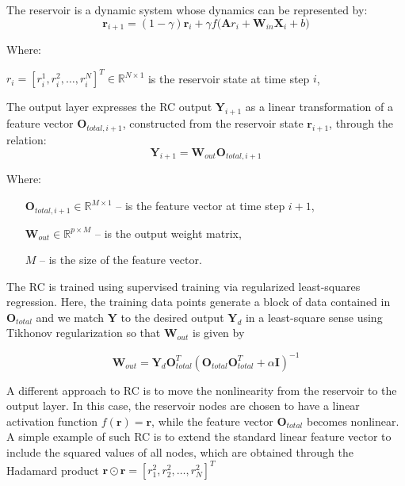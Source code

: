 \documentclass[11pt, oneside]{article}
\begin{document}
The reservoir is a
dynamic system whose dynamics can be represented by:
\begin{equation}
    \mathbf{r}_{i+1} = (1 - \gamma) \mathbf{r}_i + \gamma f \big(\mathbf{A} r_i + \mathbf{W}_{in} \mathbf{X}_i + b \big)
\end{equation}

Where:

\( r_i = [r_i^1, r_i^2, \ldots, r_i^N]^T \in \mathbb{R}^{N \times 1} \) is the reservoir state at time step \(i\),

The output layer expresses the RC output \(\mathbf{Y}_{i+1}\) as a linear
transformation of a feature vector \(\mathbf{O}_{total,i+1}\), constructed from the
reservoir state \(\mathbf{r}_{i+1}\), through the relation:
\begin{equation}
    \mathbf{Y}_{i+1} = \mathbf{W}_{out} \mathbf{O}_{total,i+1}
\end{equation}

Where:
\begin{itemize}[noitemsep, leftmargin=4cm, label={}]
    \item [\(\mathbf{O}_{total,i+1} \in \mathbb{R}^{M \times 1}\)] -- is the feature vector at time step \(i+1\),
    \item [\(\mathbf{W}_{out} \in \mathbb{R}^{p \times M}\)] -- is the output weight matrix,
    \item [\(M\)] -- is the size of the feature vector.
\end{itemize}


The RC is trained using supervised training via regularized least-squares regression. Here, the training data points generate a block of data contained in \(\mathbf{O}_{total}\) and we match \(\mathbf{Y}\) to the desired output \(\mathbf{Y}_d\) in a least-square sense using Tikhonov regularization so that \(\mathbf{W}_{out}\) is given by

\begin{equation}
    \mathbf{W}_{out} = \mathbf{Y}_d \mathbf{O}_{total}^T (\mathbf{O}_{total} \mathbf{O}_{total}^T + \alpha \mathbf{I})^{-1}
\end{equation}

A different approach to RC is to move the nonlinearity from the reservoir to the output layer. In this case, the reservoir nodes are chosen to have a linear activation function \(f(\mathbf{r}) = \mathbf{r}\), while the feature vector \(\mathbf{O}_{total}\) becomes nonlinear. A simple example of such RC is to extend the standard linear feature vector to include the squared values of all nodes, which are obtained through the Hadamard product \( \mathbf{r} \odot \mathbf{r} =  [r_1^2, r_2^2, \ldots, r_N^2]^T \)
\end{document}
